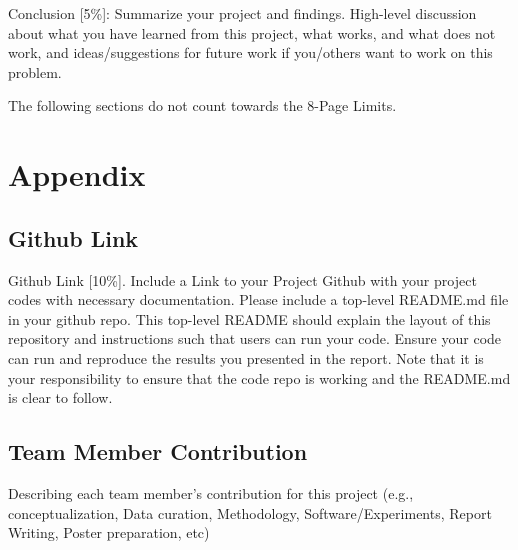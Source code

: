 \documentclass{article}
\newcommand{\instructions}[1]{{\color{blue} #1}}
\begin{document}
\instructions{Conclusion [5\%]: Summarize your project and findings. High-level discussion about what you have learned from this project, what works, and what does not work, and ideas/suggestions for future work if you/others want to work on this problem.} 



\newpage
\instructions{The following sections do not count towards the 8-Page Limits.}
\section*{Appendix}
\subsection*{Github Link}
\instructions{Github Link [10\%]. Include a Link to your Project Github with your project codes with necessary documentation. Please include a top-level README.md file in your github repo. This top-level README should explain the layout of this repository and instructions such that users can run your code. Ensure your code can run and reproduce the results you presented in the report. Note that it is your responsibility to ensure that the code repo is working and the README.md is clear to follow.}

\subsection*{Team Member Contribution}
\instructions{Describing each team member's contribution for this project (e.g., conceptualization, Data curation, Methodology, Software/Experiments, Report Writing, Poster preparation, etc)} 



\end{document}
